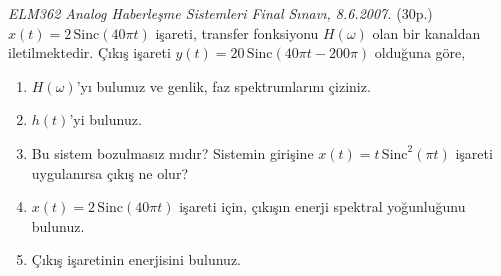 \documentclass[11pt,a4paper]{article}
\begin{document}

\begin{ornek}[1]
  \textit{ELM362 Analog Haberleşme Sistemleri Final Sınavı, 8.6.2007.} (30p.) $x(t)=2\,\mathrm{Sinc}(40\pi t)$ işareti, transfer fonksiyonu $H(\omega)$ olan bir kanaldan iletilmektedir. Çıkış işareti $y(t)=20\,\mathrm{Sinc}(40\pi t-200\pi)$ olduğuna göre,
  \begin{enumerate}[label=\alph*),nosep,leftmargin=*]
    \item $H(\omega)$'yı bulunuz ve genlik, faz spektrumlarını çiziniz.
    \item $h(t)$'yi bulunuz.
    \item Bu sistem bozulmasız mıdır? Sistemin girişine $x(t)=t\,\mathrm{Sinc}^2(\pi t)$ işareti uygulanırsa çıkış ne olur?
    \item $x(t)=2\,\mathrm{Sinc}(40\pi t)$ işareti için, çıkışın enerji spektral yoğunluğunu bulunuz.
    \item Çıkış işaretinin enerjisini bulunuz.
  \end{enumerate}
\end{ornek}
\end{document}
